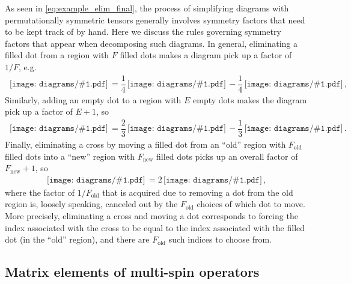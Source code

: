 \documentclass[nofootinbib,notitlepage,11pt]{revtex4-2}
\renewcommand{\t}{\text} %
\newcommand{\f}[2]{\dfrac{#1}{#2}} %
\newcommand{\1}{\mathds{1}}
\newcommand{\diagram}[1]
{\,\texttt{[image: diagrams/\#1.pdf]}\,}
\begin{document}
As seen in \eqref{eq:example_elim_final}, the process of simplifying
diagrams with permutationally symmetric tensors generally involves
symmetry factors that need to be kept track of by hand.  Here we
discuss the rules governing symmetry factors that appear when
decomposing such diagrams.  In general, eliminating a filled dot from
a region with $F$ filled dots makes a diagram pick up a factor of
$1/F$, e.g.
\begin{align}
  \diagram{example_sym}
  = \f14 \diagram{example_sym_o}
  - \f14 \diagram{example_sym_x},
\end{align}
Similarly, adding an empty dot to a region with $E$ empty dots makes
the diagram pick up a factor of $E+1$, so
\begin{align}
  \diagram{example_sym_o}
  = \f23 \diagram{example_sym_oo}
  - \f13 \diagram{example_sym_ox}.
\end{align}
Finally, eliminating a cross by moving a filled dot from an ``old''
region with $F_{\t{old}}$ filled dots into a ``new'' region with
$F_{\t{new}}$ filled dots picks up an overall factor of
$F_{\t{new}}+1$, so
\begin{align}
  \diagram{example_sym_x} = 2 \diagram{example_sym_x_elim},
\end{align}
where the factor of $1/F_{\t{old}}$ that is acquired due to removing a
dot from the old region is, loosely speaking, canceled out by the
$F_{\t{old}}$ choices of which dot to move.  More precisely,
eliminating a cross and moving a dot corresponds to forcing the index
associated with the cross to be equal to the index associated with the
filled dot (in the ``old'' region), and there are $F_{\t{old}}$ such
indices to choose from.

\subsection{Matrix elements of multi-spin operators}
\end{document}
